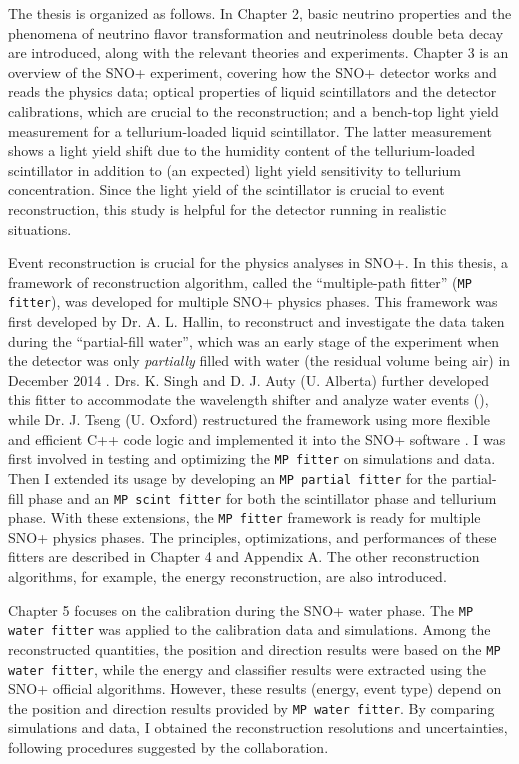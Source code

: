 The thesis is organized as follows. In Chapter 2, basic neutrino properties and the phenomena of neutrino flavor transformation and neutrinoless double beta decay are introduced, along with the relevant theories and experiments. Chapter 3 is an overview of the SNO+ experiment, covering how the SNO+ detector works and reads the physics data; optical properties of liquid scintillators and the detector calibrations, which are crucial to the reconstruction; and a bench-top light yield measurement for a tellurium-loaded liquid scintillator. The latter measurement shows a light yield shift due to the humidity content of the tellurium-loaded scintillator in addition to (an expected) light yield sensitivity to tellurium concentration. Since the light yield of the scintillator is crucial to event reconstruction, this study is helpful for the detector running in realistic situations.

Event reconstruction is crucial for the physics analyses in SNO+. In this thesis, a framework of reconstruction algorithm, called the ``multiple-path fitter'' (\texttt{MP fitter}), was developed for multiple SNO+ physics phases. This framework was first developed by Dr. A. L. Hallin, to reconstruct and investigate the data taken during the ``partial-fill water'', which was an early stage of the experiment when the detector was only {\em partially} filled with water (the residual volume being air) in December 2014 \cite{partialWater}. Drs. K. Singh and D. J. Auty (U. Alberta) further developed this fitter to accommodate the wavelength shifter and analyze water events (\cite{davidPartialWater, kalpanaWLS, kalpanaWLS2, kalpanaMPFitter}), while Dr. J. Tseng (U. Oxford) restructured the framework using more flexible and efficient C++ code logic and implemented it into the SNO+ software \cite{jieMPW}. I was first involved in testing and optimizing the \texttt{MP fitter} on simulations and data. Then I extended its usage by developing an \texttt{MP partial fitter} for the partial-fill phase and an \texttt{MP scint fitter} for both the scintillator phase and tellurium phase. With these extensions, the \texttt{MP fitter} framework is ready for multiple SNO+ physics phases. The principles, optimizations, and performances of these fitters are described in Chapter 4 and Appendix A. The other reconstruction algorithms, for example, the energy reconstruction, are also introduced.

Chapter 5 focuses on the calibration during the SNO+ water phase. The \texttt{MP water fitter} was applied to the calibration data and simulations. Among the reconstructed quantities, the position and direction results were based on the \texttt{MP water fitter}, while the energy and classifier results were extracted using the SNO+ official algorithms. However, these results (energy, event type) depend on the position and direction results provided by \texttt{MP water fitter}. By comparing simulations and data, I obtained the reconstruction resolutions and uncertainties, following procedures suggested by the collaboration.

